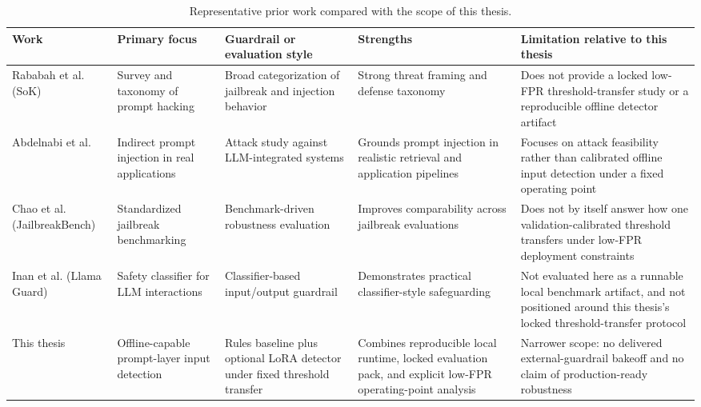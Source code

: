 \begin{table}[t]
\centering
\caption{Representative prior work compared with the scope of this thesis.}
\label{tab:related_work_comparison}
\scriptsize
\begin{tabularx}{\textwidth}{p{}p{}p{}p{}X}
\toprule
Work & Primary focus & Guardrail or evaluation style & Strengths & Limitation relative to this thesis \\
\midrule
Rababah et al. (SoK) \cite{rababah2024sokprompthacking} & Survey and taxonomy of prompt hacking & Broad categorization of jailbreak and injection behavior & Strong threat framing and defense taxonomy & Does not provide a locked low-FPR threshold-transfer study or a reproducible offline detector artifact \\
Abdelnabi et al. \cite{abdelnabi2023promptinjection} & Indirect prompt injection in real applications & Attack study against LLM-integrated systems & Grounds prompt injection in realistic retrieval and application pipelines & Focuses on attack feasibility rather than calibrated offline input detection under a fixed operating point \\
Chao et al. (JailbreakBench) \cite{chao2024jailbreakbench} & Standardized jailbreak benchmarking & Benchmark-driven robustness evaluation & Improves comparability across jailbreak evaluations & Does not by itself answer how one validation-calibrated threshold transfers under low-FPR deployment constraints \\
Inan et al. (Llama Guard) \cite{inan2023llamaguard} & Safety classifier for LLM interactions & Classifier-based input/output guardrail & Demonstrates practical classifier-style safeguarding & Not evaluated here as a runnable local benchmark artifact, and not positioned around this thesis's locked threshold-transfer protocol \\
This thesis & Offline-capable prompt-layer input detection & Rules baseline plus optional LoRA detector under fixed threshold transfer & Combines reproducible local runtime, locked evaluation pack, and explicit low-FPR operating-point analysis & Narrower scope: no delivered external-guardrail bakeoff and no claim of production-ready robustness \\
\bottomrule
\end{tabularx}
\normalsize
\end{table}
